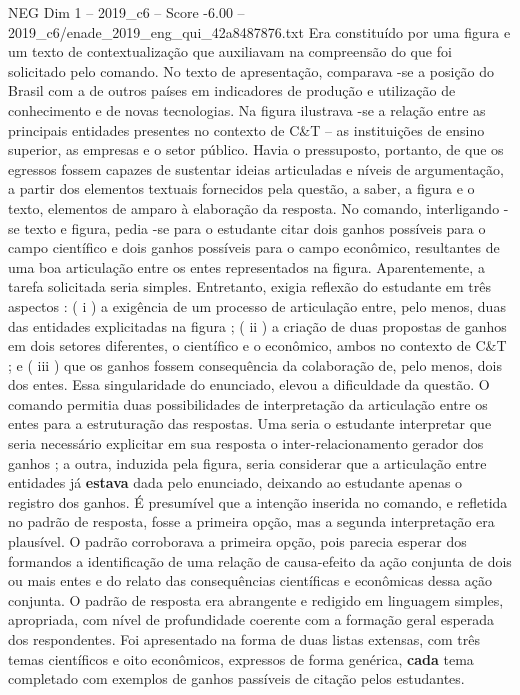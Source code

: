 \begin{textsample}{NEG Dim 1 – 2019\_c6 – Score -6.00 – 2019\_c6/enade\_2019\_eng\_qui\_42a8487876.txt}
Era constituído por uma figura e um texto de contextualização que auxiliavam na compreensão do que foi solicitado pelo comando.
No texto de apresentação, comparava -se a posição do Brasil com a de outros países em indicadores de produção e utilização de conhecimento e de novas tecnologias.
Na figura ilustrava -se a relação entre as principais entidades presentes no contexto de C\&T – as instituições de ensino superior, as empresas e o setor público.
Havia o pressuposto, portanto, de que os egressos fossem capazes de sustentar ideias articuladas e níveis de argumentação, a partir dos elementos textuais fornecidos pela questão, a saber, a figura e o texto, elementos de amparo à elaboração da resposta.
No comando, interligando -se texto e figura, pedia -se para o estudante citar dois ganhos possíveis para o campo científico e dois ganhos possíveis para o campo econômico, resultantes de uma boa articulação entre os entes representados na figura.
Aparentemente, a tarefa solicitada seria simples.
Entretanto, exigia reflexão do estudante em três aspectos : ( i ) a exigência de um processo de articulação entre, pelo menos, duas das entidades explicitadas na figura ; ( ii ) a criação de duas propostas de ganhos em dois setores diferentes, o científico e o econômico, ambos no contexto de C\&T ; e ( iii ) que os ganhos fossem consequência da colaboração de, pelo menos, dois dos entes.
Essa singularidade do enunciado, elevou a dificuldade da questão.
O comando permitia duas possibilidades de interpretação da articulação entre os entes para a estruturação das respostas.
Uma seria o estudante interpretar que seria necessário explicitar em sua resposta o inter-relacionamento gerador dos ganhos ; a outra, induzida pela figura, seria considerar que a articulação entre entidades já \textbf{estava} dada pelo enunciado, deixando ao estudante apenas o registro dos ganhos.
É presumível que a intenção inserida no comando, e refletida no padrão de resposta, fosse a primeira opção, mas a segunda interpretação era plausível.
O padrão corroborava a primeira opção, pois parecia esperar dos formandos a identificação de uma relação de causa-efeito da ação conjunta de dois ou mais entes e do relato das consequências científicas e econômicas dessa ação conjunta.
O padrão de resposta era abrangente e redigido em linguagem simples, apropriada, com nível de profundidade coerente com a formação geral esperada dos respondentes.
Foi apresentado na forma de duas listas extensas, com três temas científicos e oito econômicos, expressos de forma genérica, \textbf{cada} tema completado com exemplos de ganhos passíveis de citação pelos estudantes.

\end{textsample}
